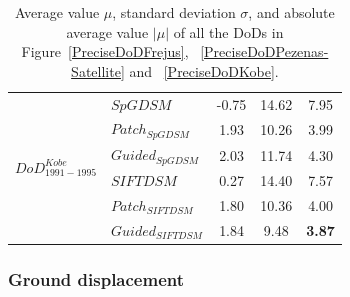 \begin{table}
\begin{tabular}{||l|l|c|c|c||}
		\multirow{6}{*}{$DoD^{Kobe}_{1991-1995}$}
		&${{SpGDSM}}$ & -0.75 & 14.62 & 7.95\\
		&${Patch_{SpGDSM}}$ & 1.93 & 10.26 & 3.99\\
		&${Guided_{SpGDSM}}$ & 2.03 & 11.74 & 4.30\\
		&${{SIFTDSM}}$ & 0.27 & 14.40 & 7.57\\
		&${Patch_{SIFTDSM}}$ & 1.80 & 10.36 & 4.00\\
		&${Guided_{SIFTDSM}}$ & 1.84 & 9.48 & \textbf{3.87}\\\hline
		
		
	\end{tabular}
	\caption{Average value $\mu$, standard deviation $\sigma$, and absolute average value $|\mu|$ of all the \ac{DoD}s in Figure~\ref{PreciseDoDFrejus}, ~\ref{PreciseDoDPezenas-Satellite} and ~\ref{PreciseDoDKobe}.}
	\label{DoDStatistic}
\end{table}


\subsubsection{Ground displacement}


